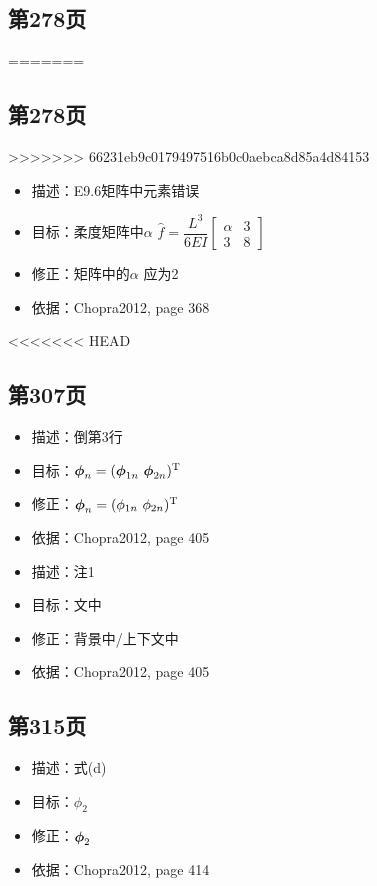 \documentclass[11pt]{article}
\begin{document}
\subsection*{第278页}
\label{sec:orgeff68db}
=======
\subsection*{第278页}
\label{sec:org56e2164}
>>>>>>> 66231eb9c0179497516b0c0aebca8d85a4d84153

\begin{itemize}
\item 描述：E9.6矩阵中元素错误
\item 目标：柔度矩阵中\(\alpha\)
\(\hat{f}=\dfrac{L^{3}}{6EI}\begin{bmatrix}\alpha&3\\3&8\end{bmatrix}\)
\item 修正：矩阵中的\(\alpha\) 应为2
\item 依据：Chopra2012, page 368
\end{itemize}

<<<<<<< HEAD
\subsection*{第307页}
\label{sec:orga33fedf}

\begin{itemize}
\item 描述：倒第3行
\item 目标：\(\vphin = (\vphi{1n}\ \vphi{2n})^{\mathrm{T}}\)
\item 修正：\(\vphin = (\phi_{1n}\ \phi_{2n})^{\mathrm{T}}\)
\item 依据：Chopra2012, page 405

\item 描述：注1
\item 目标：文中
\item 修正：背景中/上下文中
\item 依据：Chopra2012, page 405
\end{itemize}

\subsection*{第315页}
\label{sec:org73f259a}

\begin{itemize}
\item 描述：式(d)
\item 目标：\(\phi_2\)
\item 修正：\(\bm{\mathrm{\phi}}_{2}\)
\item 依据：Chopra2012, page 414
\end{itemize}
\end{document}
